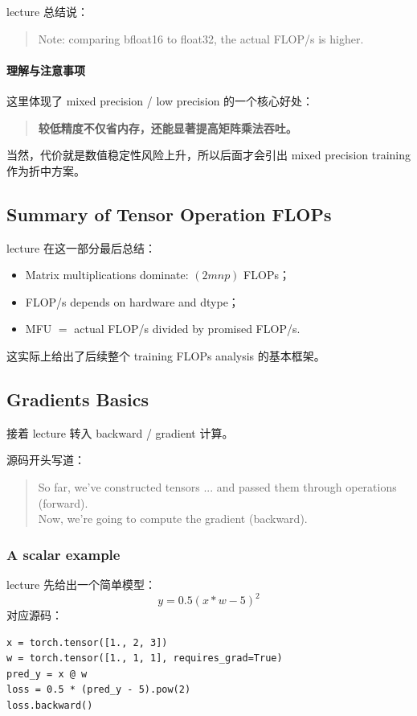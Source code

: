 \documentclass[a4paper,UTF8]{article}
\numberwithin{equation}{section}
\begin{document}
lecture 总结说：
\begin{quote}
Note: comparing bfloat16 to float32, the actual FLOP/s is higher.
\end{quote}

\paragraph{理解与注意事项}
这里体现了 mixed precision / low precision 的一个核心好处：

\begin{quote}
\textbf{较低精度不仅省内存，还能显著提高矩阵乘法吞吐。}
\end{quote}

当然，代价就是数值稳定性风险上升，所以后面才会引出 mixed precision training 作为折中方案。

\subsection{Summary of Tensor Operation FLOPs}

lecture 在这一部分最后总结：
\begin{itemize}
    \item Matrix multiplications dominate: \((2mnp)\) FLOPs；
    \item FLOP/s depends on hardware and dtype；
    \item MFU \(=\) actual FLOP/s divided by promised FLOP/s.
\end{itemize}

这实际上给出了后续整个 training FLOPs analysis 的基本框架。

\subsection{Gradients Basics}

接着 lecture 转入 backward / gradient 计算。

源码开头写道：
\begin{quote}
So far, we've constructed tensors ... and passed them through operations (forward). \\
Now, we're going to compute the gradient (backward).
\end{quote}

\subsubsection{A scalar example}

lecture 先给出一个简单模型：
\[
y = 0.5 (x * w - 5)^2
\]
对应源码：
\begin{verbatim}
x = torch.tensor([1., 2, 3])
w = torch.tensor([1., 1, 1], requires_grad=True)
pred_y = x @ w
loss = 0.5 * (pred_y - 5).pow(2)
loss.backward()
\end{verbatim}
\end{document}
